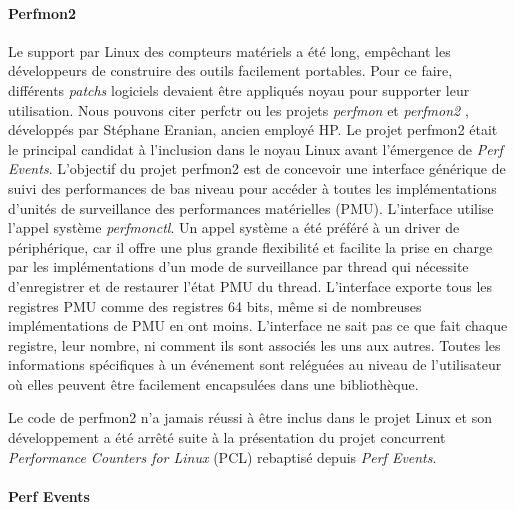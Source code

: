         \paragraph{Perfmon2}
            Le support par Linux des compteurs matériels a été long, empêchant les développeurs de construire des outils facilement portables. Pour ce faire, différents \textit{patchs} logiciels devaient être appliqués noyau pour supporter leur utilisation. Nous pouvons citer perfctr \cite{Pettersson2005} ou les projets \textit{perfmon} et \textit{perfmon2} \cite{Eranian2006}, développés par Stéphane Eranian, ancien employé HP. Le projet perfmon2 était le principal candidat à l'inclusion dans le noyau Linux avant l'émergence de \textit{Perf Events}. L'objectif du projet perfmon2 est de concevoir une interface générique de suivi des performances de bas niveau pour accéder à toutes les implémentations d'unités de surveillance des performances matérielles (PMU).
            L'interface utilise l'appel système \textit{perfmonctl}. Un appel système a été préféré à un driver de périphérique, car il offre une plus grande flexibilité et facilite la prise en charge par les implémentations d'un mode de surveillance par thread qui nécessite d'enregistrer et de restaurer l'état PMU du thread. L'interface exporte tous les registres PMU comme des registres 64 bits, même si de nombreuses implémentations de PMU en ont moins. L'interface ne sait pas ce que fait chaque registre, leur nombre, ni comment ils sont associés les uns aux autres. Toutes les informations spécifiques à un événement sont reléguées au niveau de l'utilisateur où elles peuvent être facilement encapsulées dans une bibliothèque.
        
            Le code de perfmon2 n'a jamais réussi à être inclus dans le projet Linux et son développement a été arrêté suite à la présentation du projet concurrent \textit{Performance Counters for Linux} (PCL) rebaptisé depuis \textit{Perf Events}.

        \paragraph{Perf Events}\label{sec:edl_profiling_perf}
        
